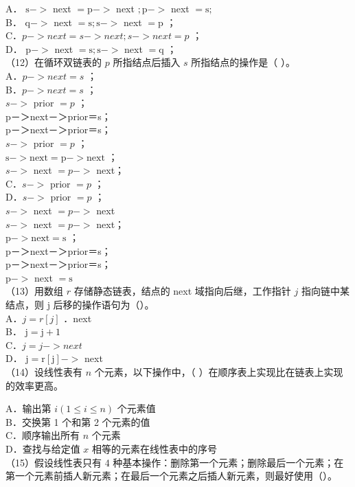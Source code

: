 \documentclass[10pt]{article}
\begin{document}
A． $\mathrm{s}->$ next $=\mathrm{p}->$ next $; \mathrm{p}->$ next $=\mathrm{s} ;$\\
B． $\mathrm{q}->$ next $=\mathrm{s} ; \mathrm{s}->$ next $=\mathrm{p}$ ；\\
C．$p->n e x t=s->n e x t ; s->n e x t=p$ ；\\
D． $\mathrm{p}->$ next $=\mathrm{s} ; \mathrm{s}->$ next $=\mathrm{q}$ ；\\
（12）在循环双链表的 $p$ 所指结点后插入 $s$ 所指结点的操作是（ ）。\\
A．$p->n e x t=s$ ；\\
B．$p->n e x t=s$ ；\\
$s->$ prior $=p$ ；\\
p－＞next－＞prior＝s；\\
p－＞next－＞prior＝s；\\
$s->$ prior $=p$ ；\\
$\mathrm{s}->\mathrm{next}=\mathrm{p}->\mathrm{next}$ ；\\
$s->$ next $=p->$ next；\\
C．$s->$ prior $=p$ ；\\
D．$s->$ prior $=p$ ；\\
$s->$ next $=p->$ next\\
$s->$ next $=p->$ next；\\
$\mathrm{p}->\mathrm{next}=\mathrm{s}$ ；\\
p－＞next－＞prior＝s；\\
p－＞next－＞prior＝s；\\
$\mathrm{p}->$ next $=\mathrm{s}$\\
（13）用数组 $r$ 存储静态链表，结点的 next 域指向后继，工作指针 $j$ 指向链中某结点，则 j 后移的操作语句为（）。\\
A．$j=r[j]$ ．next\\
B． $\mathrm{j}=\mathrm{j}+1$\\
C．$j=j->n e x t$\\
D． $\mathrm{j}=\mathrm{r}[\mathrm{j}]->$ next\\
（14）设线性表有 $n$ 个元素，以下操作中，（ ）在顺序表上实现比在链表上实现的效率更高。

A．输出第 $i(1 \leqslant i \leqslant n)$ 个元素值\\
B．交换第 1 个和第 2 个元素的值\\
C．顺序输出所有 $n$ 个元素\\
D．查找与给定值 $x$ 相等的元素在线性表中的序号\\
（15）假设线性表只有 4 种基本操作：删除第一个元素；删除最后一个元素；在第一个元素前插人新元素；在最后一个元素之后插人新元素，则最好使用（）。
\end{document}
